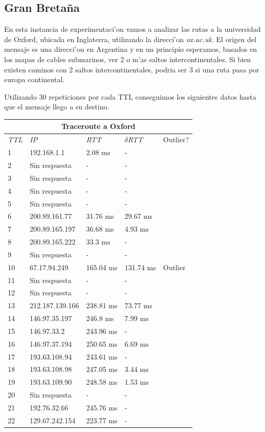 \subsection{Gran Breta\~na}
En esta instancia de experimentaci'on vamos a analizar las rutas a la universidad de Oxford, ubicada en Inglaterra, utilizando la direcci'on \textit{ox.ac.uk}. 
El origen del mensaje es una direcci'on en Argentina y en un principio esperamos, basados en los mapas de cables submarinos, ver 2 o m'as saltos intercontinentales. Si bien
existen caminos con 2 saltos intercontinentales, podria ser 3 si una ruta pasa por europa continental. 

Utilizando 30 repeticiones por cada TTL conseguimos los siguientes datos hasta que el mensaje llego a su destino.

\begin{tabular}{ |p{1cm}||p{3cm}|p{2cm}|p{2cm}|p{1.5cm}|  }
 \hline
 \multicolumn{5}{|c|}{Traceroute a Oxford} \\
 \hline
 \textit{TTL} & \textit{IP}  & \textit{RTT} & $\delta$\textit{RTT} & Outlier? \\
 \hline
 1   & 192.168.1.1   & 2.08 ms &   - &   \\
 2   & Sin respuesta  & - 	&   - &   \\
 3   & Sin respuesta  & - 	&   - &   \\
 4   & Sin respuesta  & - 	&   - &   \\
 5   & Sin respuesta  & - 	&   - &   \\
 6   & 200.89.161.77  & 31.76 ms &  29.67 ms &   \\
 7   & 200.89.165.197  & 36.68 ms &  4.93 ms &    \\
 8   & 200.89.165.222  & 33.3 ms &  - &   \\
 9   & Sin respuesta  & - &   - &   \\
 10   & 67.17.94.249 & 165.04 ms &  131.74 ms & Outlier \\
 11   & Sin respuesta   & - &   - &   \\
 12   & Sin respuesta   & - &   - &   \\
13   &   212.187.139.166&    238.81 ms  &      73.77 ms  &    \\    
14   &   146.97.35.197  &    246.8 ms   &      7.99 ms  &   \\       
15   &   146.97.33.2   &     243.96 ms  &      -    &   \\         
16   &   146.97.37.194   &   250.65 ms  &      6.69 ms  &    \\       
17   &   193.63.108.94   &   243.61 ms  &      -   &    \\         
18    &  193.63.108.98   &   247.05 ms    &     3.44 ms   &    \\       
19   &   193.63.109.90  &    248.58 ms  &      1.53 ms  &     \\
20   &   Sin respuesta              &    -          &      -    &       \\   
21   &   192.76.32.66   &    245.76 ms  &      -     &       \\    
22   &   129.67.242.154  &   223.77 ms   &     -   &     \\
 \hline
\end{tabular}

